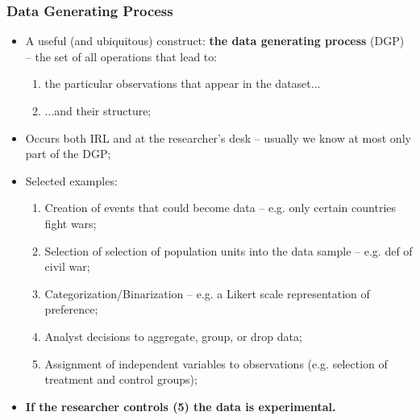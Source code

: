 \documentclass[aspectratio=169]{beamer}
\theoremstyle{principle}
\begin{document}
\begin{frame}
\frametitle{Data Generating Process}

\begin{itemize}
\item A useful (and ubiquitous) construct: \textbf{the data generating process} (DGP) -- the set of all operations that lead to:
\begin{enumerate}
\item the particular observations that appear in the dataset...
\item ...and their structure;
\end{enumerate}
\bigskip
\item Occurs both IRL and at the researcher's desk -- usually we know at most only part of the DGP;
\bigskip
\item[]\color{white} Selected examples:
\begin{enumerate}
\item[]\color{white} Creation of events that could become data -- e.g. only certain countries fight wars;
\item[]\color{white} Selection of selection of population units into the data sample -- e.g. def of civil war;
\item[]\color{white} Categorization/Binarization -- e.g. a Likert scale representation of preference;
\item[]\color{white} Analyst decisions to aggregate, group, or drop data;
\item[]\color{white} Assignment of independent variables to observations (e.g. selection of treatment and control groups);
\end{enumerate}
\bigskip
\item[] \color{white}\textbf{If the researcher controls (5) the data is experimental.}
\end{itemize}

\end{frame}
\end{document}
